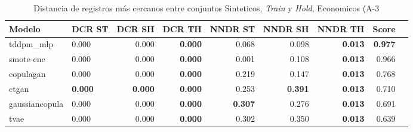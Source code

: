 \begin{table}[H]
\centering
\caption{Distancia de registros más cercanos entre conjuntos Sinteticos, \emph{Train} y \emph{Hold}, Economicos (A-3}
\label{table-dcr-economicos-a-3}
\begin{tabular}{|l|l|r|r|r|r|r|r|r|}
\hline
\rowcolor[gray]{0.8}
Modelo & DCR ST & DCR SH & DCR TH & NNDR ST & NNDR SH & NNDR TH & \textbf{Score} \\
\hline tddpm\_mlp & 0.000 & \cellcolor[rgb]{0.9, 0.54, 0.52} 0.000 & \bfseries 0.000 & 0.068 & 0.098 & \bfseries 0.013 & \bfseries 0.977 \\
\hline smote-enc & \cellcolor[rgb]{0.9, 0.54, 0.52} 0.000 & 0.000 & \bfseries 0.000 & 0.001 & 0.108 & \bfseries 0.013 & 0.966 \\
\hline copulagan & 0.000 & 0.000 & \bfseries 0.000 & 0.219 & 0.147 & \bfseries 0.013 & 0.768 \\
\hline ctgan & \bfseries 0.000 & \bfseries 0.000 & \bfseries 0.000 & 0.253 & \bfseries 0.391 & \bfseries 0.013 & 0.710 \\
\hline gaussiancopula & 0.000 & 0.000 & \bfseries 0.000 & \bfseries 0.307 & 0.276 & \bfseries 0.013 & 0.691 \\
\hline tvae & 0.000 & 0.000 & \bfseries 0.000 & 0.302 & 0.350 & \bfseries 0.013 & 0.639 \\
\hline
\end{tabular}
\end{table}
